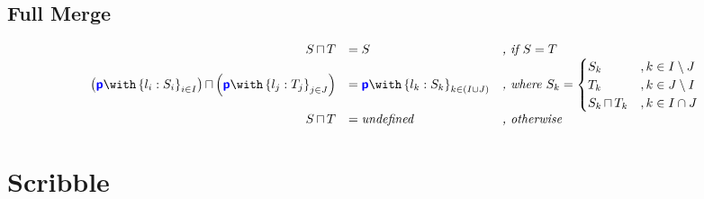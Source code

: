 \documentclass{article}
\begin{document}
\subsection{Full Merge}
\doublespacing
\[
\begin{array}{>{\displaystyle}r>{\displaystyle}ll}
		\tymerge{S}{T} & = S & \textit{, if $S = T$} \\
		\tymerge{\left(\tybra{p}{l_i: S_i}{i \in I}\right)}{\left(\tybra{p}{l_j: T_j}{j \in J}\right)} & = \tybra{p}{l_k: S_k}{k \in (I \cup J)} & \textit{, where } S_k = \begin{cases}
S_k & , k \in I \setminus J \\
T_k & , k \in J \setminus I \\
\tymerge{S_k}{T_k} & , k \in I \cap  J
\end{cases} \\
		\tymerge{S}{T} & = \textit{undefined} & \textit{, otherwise}\\
\end{array}
\]
\singlespacing

\section{Scribble}
\end{document}
